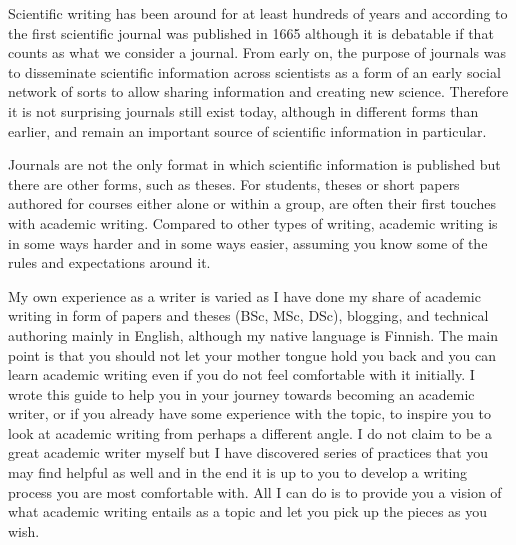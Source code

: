 


Scientific writing has been around for at least hundreds of years and according to \citet{openWhatFirst} the first scientific journal was published in 1665 although it is debatable if that counts as what we consider a journal.
From early on, the purpose of journals was to disseminate scientific information across scientists as a form of an early social network of sorts to allow sharing information and creating new science.
Therefore it is not surprising journals still exist today, although in different forms than earlier, and remain an important source of scientific information in particular.

Journals are not the only format in which scientific information is published but there are other forms, such as theses.
For students, theses or short papers authored for courses either alone or within a group, are often their first touches with academic writing.
Compared to other types of writing, academic writing is in some ways harder and in some ways easier, assuming you know some of the rules and expectations around it.

My own experience as a writer is varied as I have done my share of academic writing in form of papers and theses (BSc, MSc, DSc), blogging, and technical authoring mainly in English, although my native language is Finnish.
The main point is that you should not let your mother tongue hold you back and you can learn academic writing even if you do not feel comfortable with it initially.
I wrote this guide to help you in your journey towards becoming an academic writer, or if you already have some experience with the topic, to inspire you to look at academic writing from perhaps a different angle.
I do not claim to be a great academic writer myself but I have discovered series of practices that you may find helpful as well and in the end it is up to you to develop a writing process you are most comfortable with.
All I can do is to provide you a vision of what academic writing entails as a topic and let you pick up the pieces as you wish.

